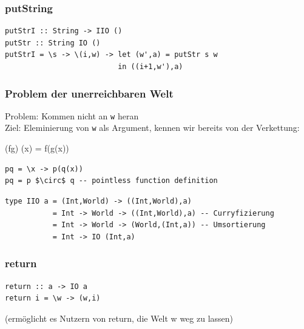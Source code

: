 
		\subsubsection{putString} %
		\label{ssub:putstring}
		
			\lstHaskell
			\begin{lstlisting}
putStrI :: String -> IIO ()
putStr :: String IO ()
putStrI = \s -> \(i,w) -> let (w',a) = putStr s w
                          in ((i+1,w'),a)
			\end{lstlisting}


		\subsubsection{Problem der unerreichbaren Welt} %
		\label{ssub:problem_der_unerreichbaren_welt}

			Problem: Kommen nicht an \texttt{w} heran\\
			Ziel: Eleminierung von \texttt{w} als Argument, kennen wir bereits von der Verkettung:

			\begin{flalign*}
(f\circ g) (x) = f(g(x))
			\end{flalign*}

			\begin{lstlisting}[mathescape]
pq = \x -> p(q(x))
pq = p $\circ$ q -- pointless function definition
			\end{lstlisting}

			\lstHaskell[Umbauen]
			\begin{lstlisting}
type IIO a = (Int,World) -> ((Int,World),a)
           = Int -> World -> ((Int,World),a) -- Curryfizierung
           = Int -> World -> (World,(Int,a)) -- Umsortierung
           = Int -> IO (Int,a)
			\end{lstlisting}
		

		\subsubsection{return} %
		\label{ssub:return}

			\lstHaskell
			\begin{lstlisting}
return :: a -> IO a
return i = \w -> (w,i)
			\end{lstlisting}
		(ermöglicht es Nutzern von return, die Welt w weg zu lassen)

